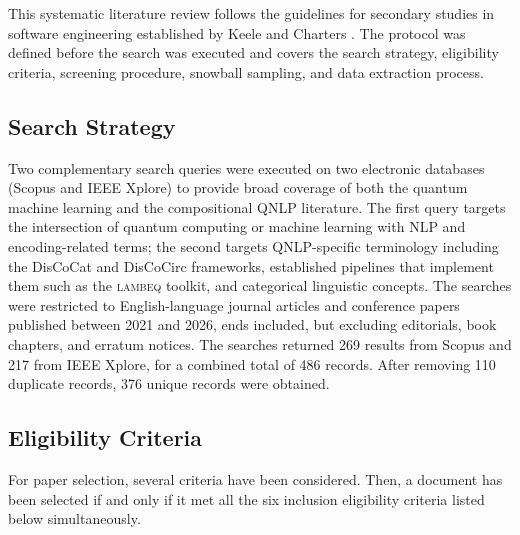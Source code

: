 \documentclass{ieeeaccess}
\begin{document}
This systematic literature review follows the guidelines for secondary studies in software engineering established by Keele and Charters \cite{keele2007guidelines}. The protocol was defined before the search was executed and covers the search strategy, eligibility criteria, screening procedure, snowball sampling, and data extraction process.

\subsection{Search Strategy}
Two complementary search queries were executed on two electronic databases (Scopus and IEEE Xplore) to provide broad coverage of both the quantum machine learning and the compositional QNLP literature. The first query targets the intersection of quantum computing or machine learning with NLP and encoding-related terms; the second targets QNLP-specific terminology including the DisCoCat and DisCoCirc frameworks, established pipelines that implement them such as the \textsc{lambeq} toolkit, and categorical linguistic concepts. The searches were restricted to English-language journal articles and conference papers published between 2021 and 2026, ends included, but excluding editorials, book chapters, and erratum notices. The searches returned 269 results from Scopus and 217 from IEEE Xplore, for a combined total of 486 records. After removing 110 duplicate records, 376 unique records were obtained.

\subsection{Eligibility Criteria}
\label{sec:criteria}

For paper selection, several criteria have been considered. Then, a document has been selected if and only if it met all the six inclusion eligibility criteria listed below simultaneously.  
\end{document}
